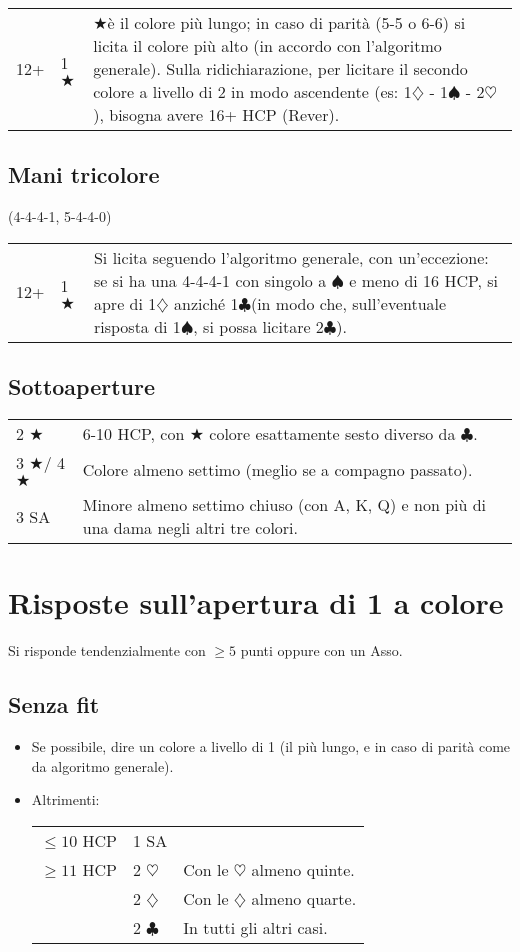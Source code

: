\documentclass[a4paper,10pt]{article}
\renewcommand{\c}{$\clubsuit$\xspace}
\renewcommand{\d}{$\diamondsuit$\xspace}
\newcommand{\h}{$\heartsuit$\xspace}
\newcommand{\s}{$\spadesuit$\xspace}
\renewcommand{\j}{$\bigstar$\xspace}
\newcommand{\sa}{SA\xspace}
\newcommand{\smallspace}{\vskip0.3cm}
\newenvironment{twocol}
  {\smallspace\noindent\begin{tabular}{l p{0.8\textwidth}}}
  {\end{tabular}\smallspace}
\newenvironment{threecol}
  {\smallspace\noindent\begin{tabular}{l l p{0.7\textwidth}}}
  {\end{tabular}\smallspace}
\begin{document}
\begin{threecol}
 12+ & 1 \j & \j \`e il colore pi\`u lungo; in caso di parit\`a (5-5 o 6-6) si licita il colore pi\`u alto (in accordo con l'algoritmo generale). Sulla ridichiarazione, per licitare il secondo colore a livello di 2 in modo ascendente (es: 1\d{} - 1\s{} - 2\h), bisogna avere 16+ HCP (Rever).
\end{threecol}


\subsection{Mani tricolore}
(4-4-4-1, 5-4-4-0)

\begin{threecol}
 12+ & 1 \j & Si licita seguendo l'algoritmo generale, con un'eccezione: se si ha una 4-4-4-1 con singolo a \s e meno di 16 HCP, si apre di 1\d anzich\'e 1\c (in modo che, sull'eventuale risposta di 1\s, si possa licitare 2\c).
\end{threecol}


\subsection{Sottoaperture}

\begin{twocol}
 2 \j & 6-10 HCP, con \j colore esattamente sesto diverso da \c.\\
 3 \j / 4 \j & Colore almeno settimo (meglio se a compagno passato).\\
 3 \sa & Minore almeno settimo chiuso (con A, K, Q) e non pi\`u di una dama negli altri tre colori.
\end{twocol}



\pagebreak

\section{Risposte sull'apertura di 1 a colore}

Si risponde tendenzialmente con $\geq 5$ punti oppure con un Asso.

\subsection{Senza fit}

\begin{itemize}
 \item Se possibile, dire un colore a livello di 1 (il pi\`u lungo, e in caso di parit\`a come da algoritmo generale).
 \item Altrimenti:
  \begin{threecol}
    $\leq 10$ HCP & 1 \sa & \\
    $\geq 11$ HCP & 2 \h & Con le \h almeno quinte.\\
    & 2 \d & Con le \d almeno quarte.\\
    & 2 \c & In tutti gli altri casi.\\
  \end{threecol}
\end{itemize}
\end{document}
